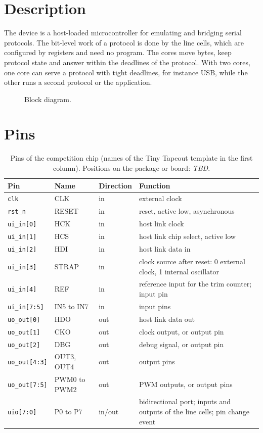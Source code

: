 \documentclass[10pt,a4paper]{article}
\newcommand{\tbd}{\textcolor{black!50}{\textit{TBD}}}
\begin{document}
\section{Description}

The device is a host-loaded microcontroller for emulating and bridging serial protocols. The bit-level work of a
protocol is done by the line cells, which are configured by registers and need no program. The cores move
bytes, keep protocol state and answer within the deadlines of the protocol. With two cores, one core can serve
a protocol with tight deadlines, for instance USB, while the other runs a second protocol or the application.

\begin{figure}[H]
\centering
\resizebox{0.92\textwidth}{!}{}
\caption{Block diagram.}
\end{figure}

\section{Pins}\label{sec:pins}

\begin{table}[H]
\centering\small
\begin{tabularx}{\linewidth}{@{}lllL@{}}
\toprule
Pin & Name & Direction & Function \\
\midrule
\texttt{clk} & CLK & in & external clock \\
\texttt{rst\_n} & RESET & in & reset, active low, asynchronous \\
\texttt{ui\_in[0]} & HCK & in & host link clock \\
\texttt{ui\_in[1]} & HCS & in & host link chip select, active low \\
\texttt{ui\_in[2]} & HDI & in & host link data in \\
\texttt{ui\_in[3]} & STRAP & in & clock source after reset: 0 external clock, 1 internal oscillator \\
\texttt{ui\_in[4]} & REF & in & reference input for the trim counter; input pin \\
\texttt{ui\_in[7:5]} & IN5 to IN7 & in & input pins \\
\texttt{uo\_out[0]} & HDO & out & host link data out \\
\texttt{uo\_out[1]} & CKO & out & clock output, or output pin \\
\texttt{uo\_out[2]} & DBG & out & debug signal, or output pin \\
\texttt{uo\_out[4:3]} & OUT3, OUT4 & out & output pins \\
\texttt{uo\_out[7:5]} & PWM0 to PWM2 & out & PWM outputs, or output pins \\
\texttt{uio[7:0]} & P0 to P7 & in/out & bidirectional port; inputs and outputs of the line cells; pin change event \\
\bottomrule
\end{tabularx}
\caption{Pins of the competition chip (names of the Tiny Tapeout template in the first column). Positions on the
package or board: \tbd.}
\end{table}
\end{document}
